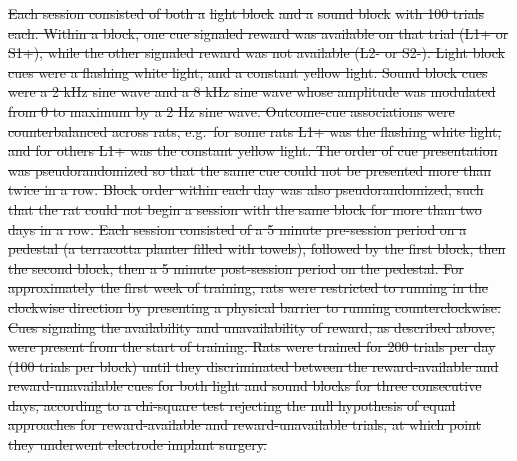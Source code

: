 \documentclass[11pt]{article}
\providecommand{\DIFdel}[1]{{\protect\color{red}\sout{#1}}}                      %
\begin{document}
\DIFdel{Each session consisted of both a }%
\DIFdel{light block}%
\DIFdel{and a }%
\DIFdel{sound block}%
\DIFdel{with
100 trials each. Within a block, one cue signaled reward was available on that
trial (L1+ or S1+), while the other signaled reward was not available (L2- or
S2-). Light block cues were a flashing white light, and a constant yellow
light. Sound block cues were a 2 kHz sine wave and a 8 kHz sine wave whose
amplitude was modulated from 0 to maximum by a 2 Hz sine wave. Outcome-cue
associations were counterbalanced across rats, e.g.\ for some rats L1+ was the
flashing white light, and for others L1+ was the constant yellow light. The
order of cue presentation was pseudorandomized so that the same cue could not be
presented more than twice in a row. Block order within each day was also
pseudorandomized, such that the rat could not begin a session with the same
block for more than two days in a row. Each session consisted of a 5 minute
pre-session period on a pedestal (a terracotta planter filled with towels),
followed by the first block, then the second block, then a 5 minute post-session
period on the pedestal. For approximately the first week of training, rats were restricted to
running in the clockwise direction by presenting a physical barrier to
running counterclockwise. Cues signaling the availability and
unavailability of reward, as described above, were present from the
start of training. Rats were trained for 200 trials per day (100
trials per block) until they discriminated between the reward-available and reward-unavailable cues for both light and
sound blocks for three consecutive days, according to a chi-square test
rejecting the null hypothesis of equal approaches for reward-available and
reward-unavailable trials, at which point they underwent electrode implant
surgery.
}%
\end{document}
